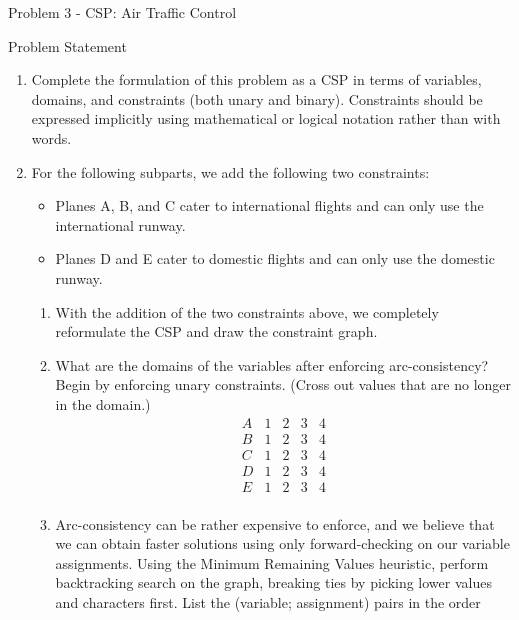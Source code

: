 \begin{problem}{Problem 3 - CSP: Air Traffic Control}
\begin{statement}{Problem Statement}
        \begin{enumerate}[label=\textbf{(\alph*)}]
            \item Complete the formulation of this problem as a CSP in terms of variables, domains, and constraints (both unary and binary). Constraints should be expressed implicitly using mathematical 
            or logical notation rather than with words.
            \item For the following subparts, we add the following two constraints:
            \begin{itemize}
                \item Planes A, B, and C cater to international flights and can only use the international runway.
                \item Planes D and E cater to domestic flights and can only use the domestic runway.
            \end{itemize}
            \begin{enumerate}[label=\textbf{(\roman*)}]
                \item With the addition of the two constraints above, we completely reformulate the CSP and draw the constraint graph.
                \item What are the domains of the variables after enforcing arc-consistency? Begin by enforcing unary constraints. (Cross out values that are no longer in the domain.)
                \begin{equation*}
                    \begin{array}{c|cccc}
                        A & 1 & 2 & 3 & 4 \\
                        B & 1 & 2 & 3 & 4 \\
                        C & 1 & 2 & 3 & 4 \\
                        D & 1 & 2 & 3 & 4 \\
                        E & 1 & 2 & 3 & 4 \\
                    \end{array}
                \end{equation*}
                \item Arc-consistency can be rather expensive to enforce, and we believe that we can obtain faster solutions using only forward-checking on our variable assignments. Using the Minimum 
                Remaining Values heuristic, perform backtracking search on the graph, breaking ties by picking lower values and characters first. List the (variable; assignment) pairs in the order 

\end{enumerate}
\end{enumerate}
\end{statement}
\end{problem}
